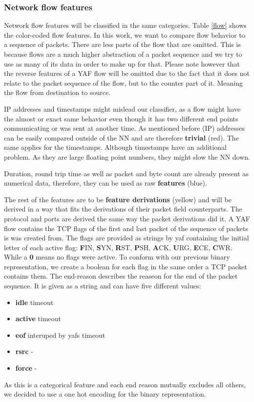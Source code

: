 \documentclass[
	ngerman,
	ruledheaders=section,%
	class=report,%
	thesis={type=bachelor},%
	accentcolor=9c,%
	custommargins=true,%
	marginpar=false,%
	parskip=half-,%
	fontsize=11pt,%
]{tudapub}
\begin{document}
\subsubsection{Network flow features}

Network flow features will be classified in the same categories.
Table \ref{flow} shows the color-coded flow features.
In this work, we want to compare flow behavior to a sequence of packets.
There are less parts of the flow that are omitted.
This is because flows are a much higher abstraction of a packet sequence and we try to use as many of its data in order to make up for that.
Please note however that the reverse features of a YAF flow will be omitted due to the fact that it does not relate to the packet sequence of the flow, but to the counter part of it.
Meaning the flow from destination to source.

IP addresses and timestamps might mislead our classifier, as a flow might have the almost or exact same behavior even though it has two different end points communicating or was sent at another time.
As mentioned before (IP) addresses can be easily compared outside of the NN and are therefore \colorbox{trivial}{\textbf{trivial} (red)}.
The same applies for the timestamps.
Although timestamps have an additional problem. As they are large floating point numbers, they might slow the NN down.

Duration, round trip time as well as packet and byte count are already present as numerical data, therefore, they can be used as raw \colorbox{feature}{\textbf{features} (blue)}.


The rest of the features are to be \colorbox{derivation}{\textbf{feature derivations} (yellow)} and will be derived in a way that fits the derivations of their packet field counterparts.
The protocol and ports are derived the same way the packet derivations did it.
A YAF flow contains the TCP flags of the first and last packet of the sequence of packets is was created from.
The flags are provided as strings by yaf containing the initial letter of each active flag:
\textbf{F}IN, \textbf{S}YN, \textbf{R}ST, \textbf{P}SH, \textbf{A}CK, \textbf{U}RG, \textbf{E}CE, \textbf{C}WR.
While a \textbf{0} means no flags were active.
To conform with our previous binary representation, we create a boolean for each flag in the same order a TCP packet contains them.
The end-reason describes the reaseon for the end of the packet sequence.
It is given as a string and can have five different values:
\begin{itemize}
    \item \textbf{idle} timeout
    \item \textbf{active} timeout
    \item \textbf{eof} interuped by yafs timeout
    \item \textbf{rsrc} -
    \item \textbf{force} -
\end{itemize}
As this is a categorical feature and each end reason mutually excludes all others, we decided to use a one hot encoding for the binary representation.
\end{document}
